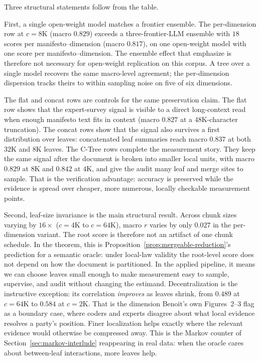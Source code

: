 Three structural statements follow from the table.

First, a single open-weight model matches a frontier ensemble. The per-dimension row at $c = 8\mathrm{K}$ (macro $0.829$) exceeds a three-frontier-LLM ensemble with $18$ scores per manifesto--dimension (macro $0.817$), on one open-weight model with one score per manifesto--dimension. The ensemble effect that \citet{BenoitEtAl2025} emphasize is therefore not necessary for open-weight replication on this corpus. A tree over a single model recovers the same macro-level agreement; the per-dimension dispersion tracks theirs to within sampling noise on five of six dimensions.

The flat and concat rows are controls for the same preservation claim.
The flat row shows that the expert-survey signal is visible to a direct
long-context read when enough manifesto text fits in context (macro
$0.827$ at a $48\mathrm{K}$-character truncation). The concat rows show
that the signal also survives a first distribution over leaves:
concatenated leaf summaries reach macro $0.837$ at both $32\mathrm{K}$
and $8\mathrm{K}$ leaves. The C-Tree rows complete the measurement
story. They keep the same signal after the document is broken into
smaller local units, with macro $0.829$ at $8\mathrm{K}$ and $0.842$ at
$4\mathrm{K}$, and give the audit many leaf and merge sites to sample.
That is the verification advantage: accuracy is preserved while the
evidence is spread over cheaper, more numerous, locally checkable
measurement points.

Second, leaf-size invariance is the main structural result. Across chunk
sizes varying by $16\times$ ($c = 4\mathrm{K}$ to $c = 64\mathrm{K}$),
macro $r$ varies by only $0.027$ in the per-dimension variant. The root
score is therefore not an artifact of one chunk schedule. In the theorem,
this is Proposition~\ref{prop:mergeable-reduction}'s prediction for a
semantic oracle: under local-law validity the root-level score does not
depend on how the document is partitioned. In the applied pipeline, it
means we can choose leaves small enough to make measurement easy to
sample, supervise, and audit without changing the estimand. Decentralization
is the instructive exception: its correlation \emph{improves} as leaves
shrink, from $0.489$ at $c = 64\mathrm{K}$ to $0.584$ at
$c = 2\mathrm{K}$. That is the dimension Benoit's own Figures~2--3 flag
as a boundary case, where coders and experts disagree about what local
evidence resolves a party's position. Finer localization helps exactly
where the relevant evidence would otherwise be compressed away. This is
the Markov counter of Section~\ref{sec:markov-interlude} reappearing in
real data: when the oracle cares about between-leaf interactions, more
leaves help.


